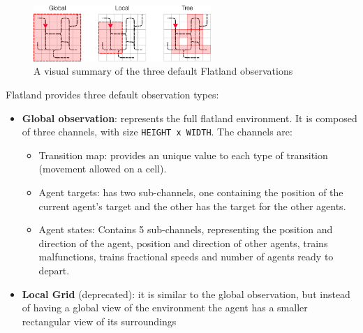 \documentclass[13pt]{article}
\begin{document}
\begin{figure}[h]
    \centering
    \includegraphics[width=0.6\textwidth]{assets/Flatland/obs.png}
    \caption{A visual summary of the three default Flatland observations}
    \label{fig:fl_obs}
\end{figure}
Flatland provides three default observation types:
\begin{itemize}
    \item \textbf{Global observation}: represents the full flatland environment. It is composed of three channels, with size \texttt{HEIGHT x WIDTH}. The channels are: 
    \begin{itemize}
        \item Transition map: provides an unique value to each type of transition (movement allowed on a cell).
        \item Agent targets: has two sub-channels, one containing the position of the current agent's target and the other has the target for the other agents.
        \item Agent states: Contains 5 sub-channels, representing the position and direction of the agent, position and direction of other agents, trains malfunctions, trains fractional speeds and number of agents ready to depart.
    \end{itemize}
    
    \item \textbf{Local Grid} (deprecated): it is similar to the global observation, but instead of having a global view of the environment the agent has a smaller rectangular view of its surroundings
    

\end{itemize}
\end{document}
